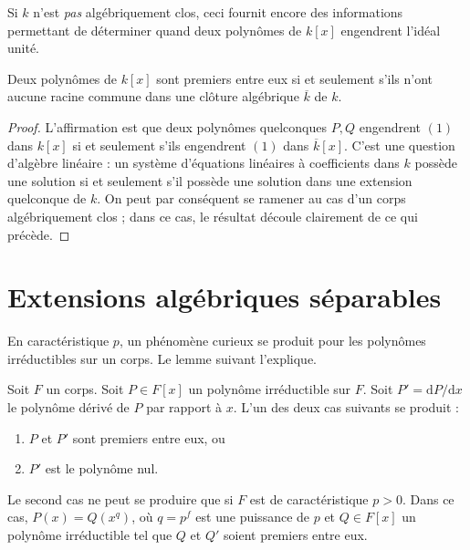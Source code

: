 \medskip\noindent
Si $k$ n'est {\it pas} algébriquement clos, ceci fournit encore des
informations permettant de déterminer quand deux polynômes de $k[x]$ engendrent l'idéal unité.

\begin{lemma}
\label{lemma-relatively-prime-polynomials}
Deux polynômes de $k[x]$ sont premiers entre eux si et seulement s'ils
n'ont aucune racine commune dans une clôture algébrique $\overline{k}$ de $k$.
\end{lemma}

\begin{proof}
L'affirmation est que deux polynômes quelconques $P, Q$ engendrent $(1)$ dans $k[x]$ si et
seulement s'ils engendrent $(1)$ dans $\overline{k}[x]$. C'est une question
d'algèbre linéaire : un système d'équations linéaires à coefficients dans $k$ possède
une solution si et seulement s'il possède une solution dans une extension quelconque de $k$.
On peut par conséquent se ramener au cas d'un corps algébriquement clos ; dans
ce cas, le résultat découle clairement de ce qui précède.
\end{proof}





\section{Extensions algébriques séparables}
\label{section-separable-extensions}

\noindent
En caractéristique $p$, un phénomène curieux se produit pour les polynômes irréductibles
sur un corps. Le lemme suivant l'explique.

\begin{lemma}
\label{lemma-irreducible-polynomials}
Soit $F$ un corps. Soit $P \in F[x]$ un polynôme irréductible sur $F$.
Soit $P' = \text{d}P/\text{d}x$ le polynôme dérivé de $P$ par rapport
à $x$. L'un des deux cas suivants se produit :
\begin{enumerate}
\item $P$ et $P'$ sont premiers entre eux, ou
\item $P'$ est le polynôme nul.
\end{enumerate}
Le second cas ne peut se produire que si $F$ est de caractéristique $p > 0$.
Dans ce cas, $P(x) = Q(x^q)$, où $q = p^f$ est une puissance de $p$ et
$Q \in F[x]$ un polynôme irréductible tel que $Q$ et $Q'$ soient
premiers entre eux.
\end{lemma}


